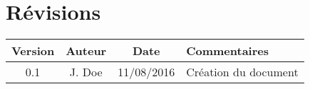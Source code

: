 \section*{Révisions}
\begin{center}
\begin{tabular}{|c|c|c|p{5.8cm}|}
\hline 
{\bf Version} 	& {\bf Auteur} 			& {\bf Date} 	& {\bf Commentaires} \\ 
\hline
\hline
0.1 			& J. {\sc Doe} 			& 11/08/2016 	& Création du document \\ 
\hline 
\end{tabular}
\end{center}
\newpage